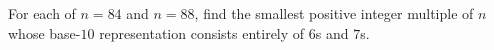 For each of $n=84$ and $n=88$, find the smallest positive integer multiple of $n$ whose base-$10$ representation consists entirely of $6$s and $7$s.
